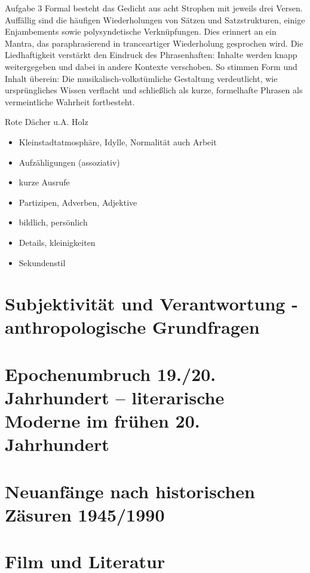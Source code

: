 \documentclass[11pt,a4paper,oneside]{article}
\begin{document}
	\begin{loesung}{Aufgabe 3}
	Formal besteht das Gedicht aus acht Strophen mit jeweils drei Versen. Auffällig sind die häufigen Wiederholungen von Sätzen und Satzstrukturen, einige Enjambements sowie polysyndetische Verknüpfungen. Dies erinnert an ein Mantra, das paraphrasierend in tranceartiger Wiederholung gesprochen wird. Die Liedhaftigkeit verstärkt den Eindruck des Phrasenhaften: Inhalte werden knapp weitergegeben und dabei in andere Kontexte verschoben. So stimmen Form und Inhalt überein: Die musikalisch-volkstümliche Gestaltung verdeutlicht, wie ursprüngliches Wissen verflacht und schließlich als kurze, formelhafte Phrasen als vermeintliche Wahrheit fortbesteht.
	\end{loesung}
	
	
	\newpage
	
	
	Rote Dächer u.A. Holz 
	
	\begin{itemize}
		\item Kleinstadtatmosphäre, Idylle, Normalität auch Arbeit 
		\item Aufzähligungen (assoziativ)
		\item kurze Ausrufe 
		\item Partizipen, Adverben, Adjektive 
		\item bildlich, persönlich 
		\item Details, kleinigkeiten 
		\item Sekundenstil 
	\end{itemize}
	
	
	
	\section{Subjektivität und Verantwortung - anthropologische Grundfragen}
	\section{Epochenumbruch 19./20. Jahrhundert – literarische Moderne im frühen 20. Jahrhundert}
	\section{Neuanfänge nach historischen Zäsuren 1945/1990}
	\section{Film und Literatur}
	
	\newpage
	
\end{document}
